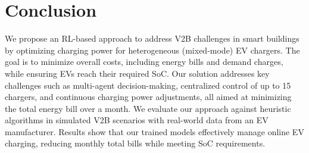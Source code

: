 \section{Conclusion}\label{sec:conclusion}
We propose an RL-based approach to address V2B challenges in smart buildings by optimizing charging power for heterogeneous (mixed-mode) EV chargers. The goal is to minimize overall costs, including energy bills and demand charges, while ensuring EVs reach their required SoC. Our solution addresses key challenges such as multi-agent decision-making, centralized control of up to 15 chargers, and continuous charging power adjustments, all aimed at minimizing the total energy bill over a month.
We evaluate our approach against heuristic algorithms in simulated V2B scenarios with real-world data from an EV manufacturer. Results show that our trained models effectively manage online EV charging, reducing monthly total bills while meeting SoC requirements. %